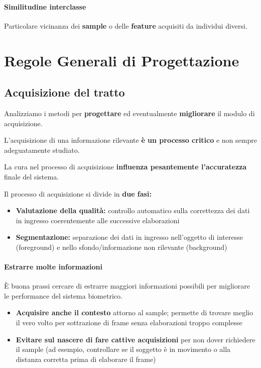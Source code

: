 \subsubsection{Similitudine interclasse}

Particolare vicinanza dei \textbf{sample} o delle \textbf{feature} acquisiti da individui diversi.

\chapter{Regole Generali di Progettazione}

\section{Acquisizione del tratto}

Analizziamo i metodi per \textbf{progettare} ed eventualmente \textbf{migliorare} il modulo di acquisizione.

\noindent L'acquisizione di una informazione rilevante \textbf{è un processo critico} e non sempre adeguatamente studiato.

\noindent La cura nel processo di acquisizione \textbf{influenza pesantemente l'accuratezza} finale del sistema.

Il processo di acquisizione si divide in \textbf{due fasi:}
\begin{itemize}
    \item \textbf{Valutazione della qualità:} controllo automatico sulla correttezza dei dati in ingresso coerentemente alle successive elaborazioni
    \item \textbf{Segmentazione:} separazione dei dati in ingresso nell'oggetto di interesse (foreground) e nello sfondo/informazione non rilevante (background)
\end{itemize}

\subsubsection{Estrarre molte informazioni}

È buona prassi cercare di estrarre maggiori informazioni possibili per migliorare le performance del sistema biometrico.
\begin{itemize}
    \item \textbf{Acquisire anche il contesto} attorno al sample; permette di trovare meglio il vero volto per sottrazione di frame senza elaborazioni troppo complesse
    \item \textbf{Evitare sul nascere di fare cattive acquisizioni} per non dover richiedere il sample (ad esempio, controllare se il soggetto è in movimento o alla distanza corretta prima di elaborare il frame)
\end{itemize}

